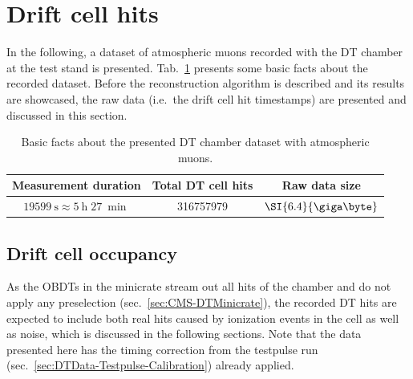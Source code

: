 \section{Drift cell hits}
\label{sec:DTData-CellHits}
In the following, a dataset of atmospheric muons recorded with the \ac{DT} chamber at the test stand is presented. Tab.\ \ref{tab:DTData-DatasetInfo} presents some basic facts about the recorded dataset. Before the reconstruction algorithm is described and its results are showcased, the raw data (i.e.\ the drift cell hit timestamps) are presented and discussed in this section.
\begin{table}[htb]
    \centering
    \begin{tabular}{|c|c|c|} 
        \hline %
        Measurement duration & Total \ac{DT} cell hits & Raw data size \\ \hline
        $\SI{19599}{\second}\approx\SI{5}{\hour}\;\SI{27}{\min}$ & \num{316757979} & $\SI{6.4}{\giga\byte}$ \\ \hline
    \end{tabular}
    \caption{Basic facts about the presented \ac{DT} chamber dataset with atmospheric muons.}
    \label{tab:DTData-DatasetInfo}
\end{table}

\subsection{Drift cell occupancy}
\label{sec:DTData-CellHits-Occupancy}
As the \acp{OBDT} in the minicrate stream out all hits of the chamber and do not apply any preselection (sec.\ \ref{sec:CMS-DTMinicrate}), the recorded \ac{DT} hits are expected to include both real hits caused by ionization events in the cell as well as noise, which is discussed in the following sections. Note that the data presented here has the timing correction from the testpulse run (sec.\ \ref{sec:DTData-Testpulse-Calibration}) already applied.
